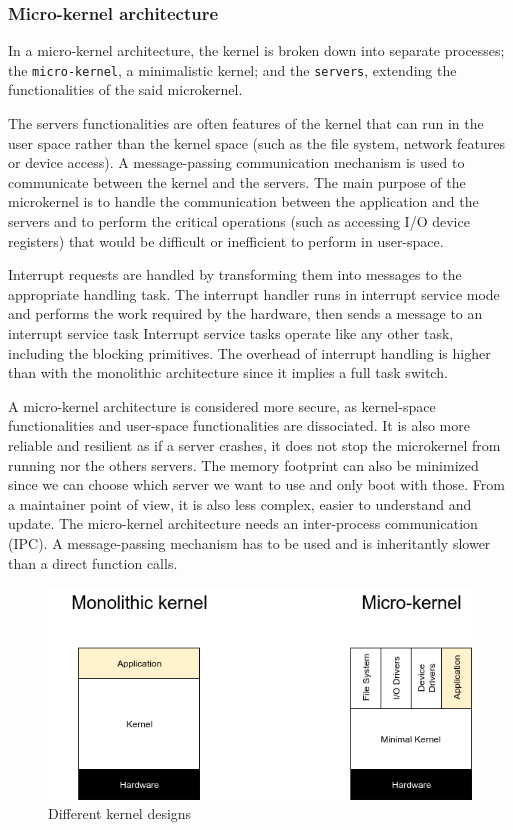 \subsubsection{Micro-kernel architecture}
In a micro-kernel architecture, the kernel is broken down into separate processes;
     the \texttt{micro-kernel}, a minimalistic kernel;
     and the \texttt{servers}, extending the functionalities of the said microkernel.

The servers functionalities are often features of the kernel that can run in the user space
    rather than the kernel space (such as the file system, network features or device access).
A message-passing communication mechanism is used to communicate between the kernel and the servers.
The main purpose of the microkernel is to handle the communication between the application and the servers
    and to perform the critical operations (such as accessing I/O device registers) that would be difficult or inefficient to perform in user-space.

Interrupt requests are handled by transforming them into messages to the appropriate handling task.
The interrupt handler runs in interrupt service mode and performs the work required by the hardware, then sends a message to an interrupt service task
Interrupt service tasks operate like any other task, including the blocking primitives.
The overhead of interrupt handling is higher than with the monolithic architecture since it implies a full task switch.

A micro-kernel architecture is considered more secure, as kernel-space functionalities and user-space functionalities are dissociated.
It is also more reliable and resilient as if a server crashes, it does not stop the microkernel from running nor the others servers.
The memory footprint can also be minimized since we can choose which server we want to use and only boot with those.
From a maintainer point of view, it is also less complex, easier to understand and update.
The micro-kernel architecture needs an inter-process communication (IPC).
A message-passing mechanism has to be used and is inheritantly slower than a direct function calls.
\\

\begin{figure}[!h]
    \centering
    \includegraphics[scale=0.7]{assets/kernel_types.png}
    \caption{\label{fig:kernel-types}Different kernel designs}
\end{figure}


